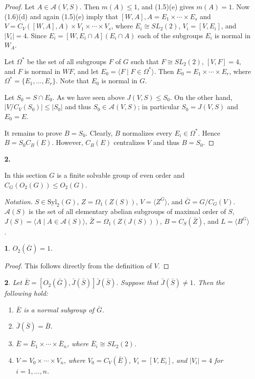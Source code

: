 \documentclass[11pt]{article}
\theoremstyle{plain}
\theoremstyle{stmplain}
\newtheorem{stm}{}[section]
\newcommand{\sect}[1]{\stepcounter{section}\par\vspace{14pt}%
  \begin{center}\textbf{#1.}\end{center}\vspace{2pt}}
\begin{document}
\begin{proof}
Let $A \in \mathcal{A}(V, S)$. Then $m(A) \le 1$, and (1.5)(e) gives $m(A) = 1$.
Now (1.6)(d) and again (1.5)(e) imply that $[W, A], A = E_1 \times \cdots \times
E_s$ and $V = C_V([W, A], A) \times V_1 \times \cdots \times V_s$, where $E_i
\cong SL_2(2)$, $V_i = [V, E_i]$, and $|V_i| = 4$. Since $E_i = [W, E_i \cap
A](E_i \cap A)$ each of the subgroups $E_i$ is normal in $W_A$.

\smallskip
\noindent Let $\Omega^*$ be the set of all subgroups $F$ of $G$ such that $F \cong
SL_2(2)$, $[V, F] = 4$, and $F$ is normal in $WF$, and let $E_0 = \langle F \mid
F \in \Omega^* \rangle$. Then $E_0 = E_1 \times \cdots \times E_r$, where
$\Omega^* = \{E_1, \ldots, E_r\}$. Note that $E_0$ is normal in $G$.

\smallskip
\noindent Let $S_0 = S \cap E_0$. As we have seen above $J(V, S) \le S_0$. On the
other hand, $|V/C_V(S_0)| \le |S_0|$ and thus $S_0 \in \mathcal{A}(V, S)$; in
particular $S_0 = J(V, S)$ and $E_0 = E$.

\smallskip
\noindent It remains to prove $B = S_0$. Clearly, $B$ normalizes every $E_i \in
\Omega^*$. Hence $B = S_0C_B(E)$. However, $C_B(E)$ centralizes $V$ and thus
$B = S_0$.
\end{proof}

\sect{2}

\noindent In this section $G$ is a finite solvable group of even order and
$C_G(O_2(G)) \le O_2(G)$.

\smallskip
\noindent\textit{Notation.} \quad $S \in \mathrm{Syl}_2(G)$, $Z = \Omega_1(Z(S))$, $V =
\langle Z^G \rangle$, and $\bar{G} = G/C_G(V)$. $\mathcal{A}(S)$ is the set of
all elementary abelian subgroups of maximal order of $S$, $J(S) = \langle A
\mid A \in \mathcal{A}(S) \rangle$, $\bar{Z} = \Omega_1(Z(J(S)))$, $B =
C_S(\bar{Z})$, and $L = \langle B^G \rangle$.

\begin{stm}\label{st:2.1}
$O_2(\bar{G}) = 1$.
\end{stm}

\begin{proof}
This follows directly from the definition of $V$.
\end{proof}

\begin{stm}\label{st:2.2}
Let $\bar{E} = [O_2(\bar{G}), \bar{J}(\bar{S})]\bar{J}(\bar{S})$. Suppose that
$\bar{J}(\bar{S}) \ne 1$. Then the following hold:
\begin{enumerate}
\item[(a)] $\bar{E}$ is a normal subgroup of $\bar{G}$.
\item[(b)] $\bar{J}(\bar{S}) = \bar{B}$.
\item[(c)] $\bar{E} = \bar{E}_1 \times \cdots \times \bar{E}_n$, where $\bar{E}_i
  \cong SL_2(2)$.
\item[(d)] $V = V_0 \times \cdots \times V_n$, where $V_0 = C_V(\bar{E})$, $V_i =
  [V, E_i]$, and $|V_i| = 4$ for $i = 1, \ldots, n$.
\end{enumerate}
\end{stm}
\end{document}
